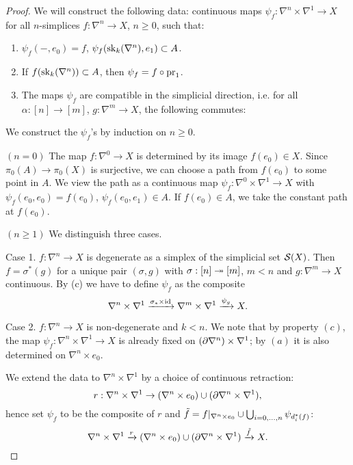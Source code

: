 \begin{proof}
We will construct the following data: continuous maps $\psi_f:\nabla^n\times\nabla^1\to X$ for all $n$-simplices $f:\nabla^n\to X$, $n\geq 0$, such that:
\begin{enumerate}[label={(\alph*)}]
    \item $\psi_f(-,e_0)=f$, $\psi_f(\sk_k(\ns),e_1)\subset A$.
    \item If $f(\sk_k(\ns))\subset A$, then $\psi_f=f\circ\pr_1$.
    \item The maps $\psi_f$ are compatible in the simplicial direction, i.e. for all $\alpha:[n]\to[m]$, $g:\nabla^m\to X$, the following commutes:
    \begin{center}
    \end{center}
\end{enumerate}

We construct the $\psi_f$'s by induction on $n\geq0$.

$(n=0)$ The map $f:\nabla^0\to X$ is determined by its image $f(e_0)\in X$. Since $\pi_0(A)\to\pi_0(X)$ is surjective, we can choose a path from $f(e_0)$ to some point in $A$. We view the path as a continuous map $\psi_f:\nabla^0\times\nabla^1\to X$ with $\psi_f(e_0,e_0)=f(e_0)$, $\psi_f(e_0,e_1)\in A$. If $f(e_0)\in A$, we take the constant path at $f(e_0)$.

$(n\geq1)$ We distinguish three cases.

Case 1. $f:\nabla^n\to X$ is degenerate as a simplex of the simplicial set $\S(X)$. Then $f=\sigma^*(g)$ for a unique pair $(\sigma,g)$ with $\sigma:[n]\onto[m]$, $m<n$ and $g:\nabla^m\to X$ continuous. By (c) we have to define $\psi_f$ as the composite
\[\nabla^n\times\nabla^1\xto{\sigma_*\times\id}\nabla^m\times\nabla^1\xto{\psi_g} X.\]

Case 2. $f:\nabla^n\to X$ is non-degenerate and $k<n$. We note that by property $(c)$, the map $\psi_f:\nabla^n\times\nabla^1\to X$ is already fixed on $(\de\nabla^n)\times\nabla^1$; by $(a)$ it is also determined on $\nabla^n\times e_0$.

We extend the data to $\nabla^n\times\nabla^1$ by a choice of continuous retraction:
\[r:\nabla^n\times\nabla^1\to (\nabla^n\times e_0)\cup(\de\nabla^n\times\nabla^1),\]
hence set $\psi_f$ to be the composite of $r$ and $\til f=f|_{\ns\times e_0}\cup\bigcup_{i=0,\dots,n}\psi_{d_i^*(f)}$\normalmarginpar{}:
\[\ns\times\sx{1}\xto{r}(\nabla^n\times e_0)\cup(\de\nabla^n\times\nabla^1)\xto{\til f} X.\]


\end{proof}
